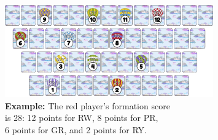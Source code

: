 \documentclass[a6paper, 11pt, parskip=half, DIV=15]{scrartcl}
\begin{document}
\vfill

\begin{figure}[hb]
\centering
\includegraphics[width=0.8\textwidth]{Images/scoring_diagram2.png}
\caption*{\textbf{Example:} The red player's formation score\\is 28: 12 points for {\setmainfont{Playball}RW}, 8 points for {\setmainfont{Playball}PR},\\6 points for {\setmainfont{Playball}GR}, and 2 points for {\setmainfont{Playball}RY}.}
\end{figure}

 \newpage
\phantom{Aloft}
\end{document}
